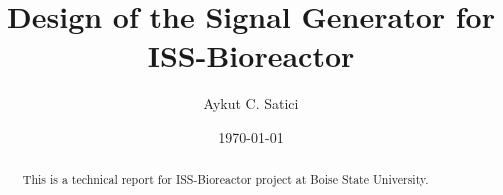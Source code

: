 \title{Design of the Signal Generator for ISS-Bioreactor}
\author         {Aykut C. Satici}
\date{\today}

\begin{abstract}
This is a technical report for ISS-Bioreactor project at Boise State University.
\end{abstract}

\maketitle

